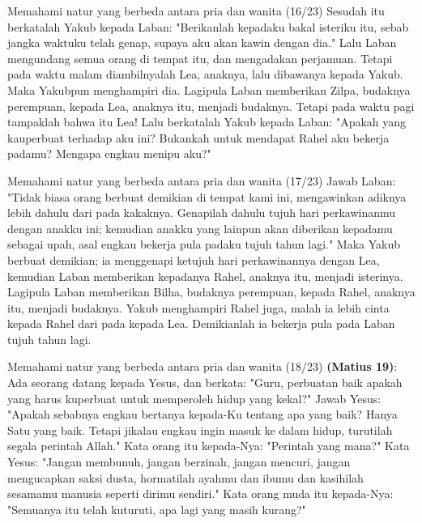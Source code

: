 \documentclass{beamer}
\theoremstyle{mystyle}
\let\emph\relax %
\begin{document}
\begin{frame}{Memahami natur yang berbeda antara pria dan wanita (16/23)}
	Sesudah itu berkatalah Yakub kepada Laban: "Berikanlah kepadaku bakal isteriku itu, sebab jangka waktuku telah genap, supaya aku akan kawin dengan dia." Lalu Laban mengundang semua orang di tempat itu, dan mengadakan perjamuan. Tetapi pada waktu malam diambilnyalah Lea, anaknya, lalu dibawanya kepada Yakub. Maka Yakubpun menghampiri dia. Lagipula Laban memberikan Zilpa, budaknya perempuan, kepada Lea, anaknya itu, menjadi budaknya. Tetapi pada waktu pagi tampaklah bahwa itu Lea! Lalu berkatalah Yakub kepada Laban: "Apakah yang kauperbuat terhadap aku ini? Bukankah untuk mendapat Rahel aku bekerja padamu? Mengapa engkau menipu aku?" 
\end{frame}

\begin{frame}{Memahami natur yang berbeda antara pria dan wanita (17/23)}
	Jawab Laban: "Tidak biasa orang berbuat demikian di tempat kami ini, mengawinkan adiknya lebih dahulu dari pada kakaknya. Genapilah dahulu tujuh hari perkawinanmu dengan anakku ini; kemudian anakku yang lainpun akan diberikan kepadamu sebagai upah, asal engkau bekerja pula padaku tujuh tahun lagi." Maka Yakub berbuat demikian; ia menggenapi ketujuh hari perkawinannya dengan Lea, kemudian Laban memberikan kepadanya Rahel, anaknya itu, menjadi isterinya. Lagipula Laban memberikan Bilha, budaknya perempuan, kepada Rahel, anaknya itu, menjadi budaknya. Yakub menghampiri Rahel juga, malah ia lebih cinta kepada Rahel dari pada kepada Lea. Demikianlah ia bekerja pula pada Laban tujuh tahun lagi.
\end{frame}

\begin{frame}{Memahami natur yang berbeda antara pria dan wanita (18/23)}
\emph{Pemuda yang kaya} \textbf{(Matius 19)}: Ada seorang datang kepada Yesus, dan berkata: "Guru, perbuatan baik apakah yang harus kuperbuat untuk memperoleh hidup yang kekal?" Jawab Yesus: "Apakah sebabnya engkau bertanya kepada-Ku tentang apa yang baik? Hanya Satu yang baik. Tetapi jikalau engkau ingin masuk ke dalam hidup, turutilah segala perintah Allah." Kata orang itu kepada-Nya: "Perintah yang mana?" Kata Yesus: "Jangan membunuh, jangan berzinah, jangan mencuri, jangan mengucapkan saksi dusta, hormatilah ayahmu dan ibumu dan kasihilah sesamamu manusia seperti dirimu sendiri." Kata orang muda itu kepada-Nya: "Semuanya itu telah kuturuti, apa lagi yang masih kurang?" 	
\end{frame}
\end{document}

